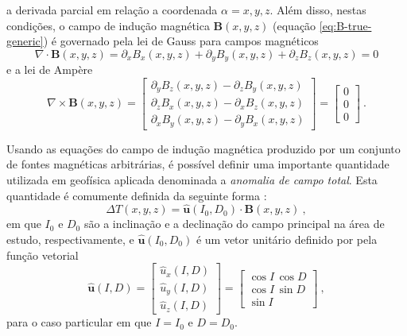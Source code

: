 a derivada parcial em relação a coordenada $\alpha = x, y, z$.
Além disso, nestas condições, o campo de indução magnética $\mathbf{B}(x, y, z)$ (equação \ref{eq:B-true-generic}) 
é governado pela lei de Gauss para campos magnéticos
\begin{equation}
\nabla \cdot \mathbf{B}(x, y, z) = 
\partial_{x} B_{x}(x, y, z) + \partial_{y} B_{y}(x, y, z) + \partial_{z} B_{z}(x, y, z) = 
0
\label{eq:lei-Gauss}
\end{equation}
e a lei de Ampère
\begin{equation}
\nabla \times \mathbf{B}(x, y, z) = \begin{bmatrix}
\partial_{y} B_{z}(x, y, z) - \partial_{z} B_{y}(x, y, z) \\
\partial_{z} B_{x}(x, y, z) - \partial_{x} B_{z}(x, y, z) \\
\partial_{x} B_{y}(x, y, z) - \partial_{y} B_{x}(x, y, z) 
\end{bmatrix} = 
\begin{bmatrix}
0 \\
0 \\
0
\end{bmatrix} \: .
\label{eq:lei-Ampere}
\end{equation}

Usando as equações do campo de indução magnética produzido por um conjunto de fontes 
magnéticas arbitrárias, é possível definir uma importante quantidade utilizada em  
geofísica aplicada denominada a \textit{anomalia de campo total}. Esta quantidade é
comumente definida da seguinte forma \citep[][ p. 179]{blakely1996}:
\begin{equation}
\Delta T(x, y, z) = \hat{\mathbf{u}}(I_{0}, D_{0}) \cdot \mathbf{B}(x, y, z) \: ,
\label{eq:Delta-T-true}
\end{equation}
em que $I_{0}$ e $D_{0}$ são a inclinação e a declinação do campo principal na área de 
estudo, respectivamente, e $\hat{\mathbf{u}}(I_{0}, D_{0})$ é um vetor unitário definido por 
pela função vetorial
\begin{equation}
\hat{\mathbf{u}}(I, D) = 
\begin{bmatrix}
\hat{u}_{x}(I, D) \\
\hat{u}_{y}(I, D) \\
\hat{u}_{z}(I, D) 
\end{bmatrix} = 
\begin{bmatrix}
\cos I \, \cos D \\
\cos I \, \sin D \\
\sin I
\end{bmatrix} \: ,
\label{eq:u-hat}
\end{equation}
para o caso particular em que $I = I_{0}$ e $D = D_{0}$.


